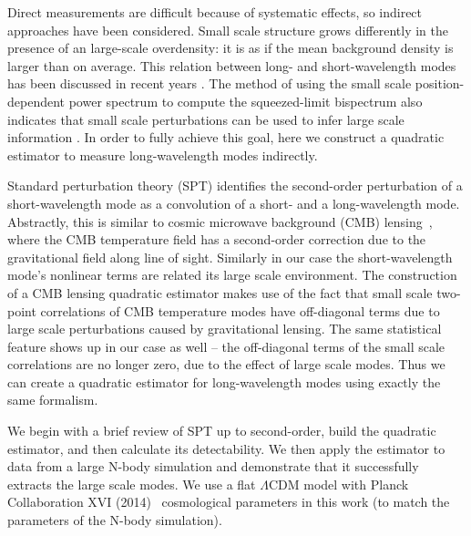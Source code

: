 \documentclass[prd,amsmath,amssymb,floatfix,superscriptaddress,nofootinbib,twocolumn]{revtex4-1}
\begin{document}
Direct measurements are difficult because of systematic effects, so indirect approaches have been considered. Small scale structure grows differently in the presence of an large-scale overdensity: it is as if the mean background density is larger than on average. This relation between long- and short-wavelength modes has been discussed in recent years \cite{Baldauf:2011fer}\cite{Barreira:2017res}. The method of using the small scale position-dependent power spectrum to compute the squeezed-limit bispectrum also indicates that small scale perturbations can be used to infer large scale information \cite{Chiang:2014pos}\cite{Chiang:2015poss}. In order to fully achieve this goal, here we construct a quadratic estimator to measure long-wavelength modes indirectly. 

Standard perturbation theory (SPT) \cite{Goroff:1986sts}\cite{Makino:1992fs}\cite{Jain:1994sop} identifies the second-order perturbation of a short-wavelength mode as a convolution of a short- and a long-wavelength mode. Abstractly, this is similar to
cosmic microwave background (CMB) lensing~\cite{Hu:2002mr}, where the CMB temperature field has a second-order correction due to the gravitational field along line of sight. Similarly in our case the short-wavelength mode's nonlinear terms are related its large scale environment.
The construction of a CMB lensing quadratic estimator makes use of the fact that small scale two-point correlations of CMB temperature modes have off-diagonal terms due to large scale perturbations caused by gravitational lensing. The same statistical feature shows up in our case as well -- the off-diagonal terms of the small scale correlations are no longer zero, due to the effect of large scale modes. Thus we can create a quadratic estimator for long-wavelength modes using exactly the same formalism. 

We begin with a brief review of SPT up to second-order, build the quadratic estimator, and then calculate its detectability. We then apply the estimator to data from a large N-body simulation and demonstrate that it successfully extracts the large scale modes. %
We use a flat $\Lambda$CDM model with Planck Collaboration XVI (2014)~\cite{Planck:2014cos} cosmological parameters in this work (to match the parameters of the N-body simulation).
\end{document}
